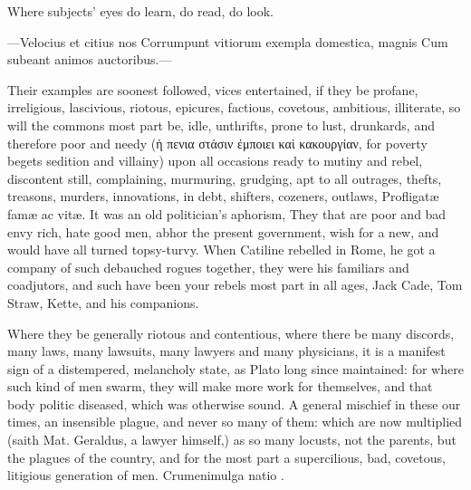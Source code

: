 {Where subjects' eyes do learn, do read, do look.

---Velocius et citius nos
Corrumpunt vitiorum exempla domestica, magnis
Cum subeant animos auctoribus.---

Their examples are soonest followed, vices entertained, if they be
profane, irreligious, lascivious, riotous, epicures, factious,
covetous, ambitious, illiterate, so will the commons most part be,
idle, unthrifts, prone to lust, drunkards, and therefore poor and needy
(ἡ πενια στάσιν ἐμποιει καὶ κακουργίαν, for poverty begets sedition and
villainy) upon all occasions ready to mutiny and rebel, discontent
still, complaining, murmuring, grudging, apt to all outrages, thefts,
treasons, murders, innovations, in debt, shifters, cozeners, outlaws,
Profligat\ae{} fam\ae{} ac vit\ae{}. It was an old politician's aphorism,
They that are poor and bad envy rich, hate good men, abhor the present
government, wish for a new, and would have all turned topsy-turvy. When
Catiline rebelled in Rome, he got a company of such debauched rogues
together, they were his familiars and coadjutors, and such have been
your rebels most part in all ages, Jack Cade, Tom Straw, Kette, and his
companions.

Where they be generally riotous and contentious, where there be many
discords, many laws, many lawsuits, many lawyers and many physicians,
it is a manifest sign of a distempered, melancholy state, as Plato
long since maintained: for where such kind of men swarm, they will make
more work for themselves, and that body politic diseased, which was
otherwise sound. A general mischief in these our times, an insensible
plague, and never so many of them: which are now multiplied (saith Mat.
Geraldus, a lawyer himself,) as so many locusts, not the parents,
but the plagues of the country, and for the most part a supercilious,
bad, covetous, litigious generation of men. Crumenimulga natio \etc{}.

}
